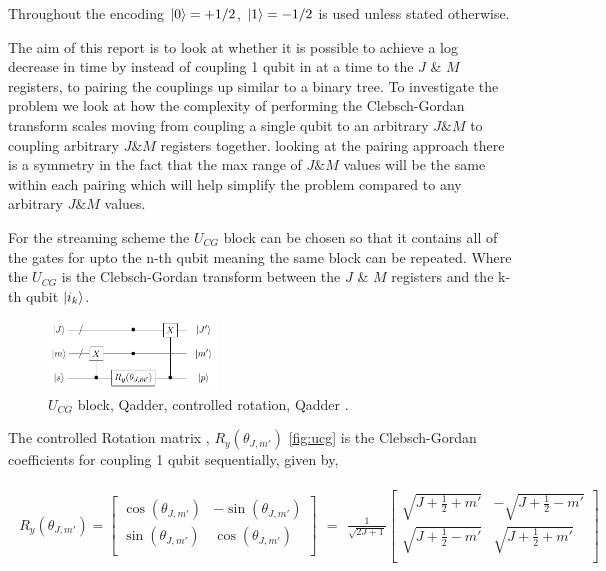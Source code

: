 \documentclass[12pt]{article}
\begin{document}
Throughout the encoding $\left\vert{0}\right\rangle=+1/2$, $\left\vert{1}\right\rangle=-1/2$ is used unless stated otherwise.

The aim of this report is to look at whether it is possible to achieve a log decrease in time by instead of coupling 1 qubit in at a time to the $J$ \& $M$ registers, to pairing the couplings up similar to a binary tree. To investigate the problem we look at how the complexity of performing the Clebsch-Gordan transform scales moving from coupling a single qubit to an arbitrary $J \& M$ to coupling arbitrary $J \& M$ registers together. looking at the pairing approach there is a symmetry in the fact that the max range of $J \& M$ values will be the same within each pairing which will help simplify the problem compared to any arbitrary $J \& M$ values.

For the streaming scheme the $U_{CG}$ block can be chosen so that it contains all of the gates for upto the n-th qubit meaning the same block can be repeated. Where the $U_{CG}$ is the Clebsch-Gordan transform between the $J$ \& $M$ registers and the k-th qubit $\left\vert{i_k}\right\rangle$.

\begin{figure}[h!]
\centering
\includegraphics[width=0.4\textwidth]{genaddercirc.png}
\caption{$U_{CG}$ block, Qadder, controlled rotation, Qadder \cite{bacon2006efficient}.}
\label{fig:ucg}
\end{figure}

The controlled Rotation matrix \cite{bacon2006efficient}, $R_y(\theta_{J,m'})$ \autoref{fig:ucg} is the Clebsch-Gordan coefficients for coupling 1 qubit sequentially, given by,

\begin{align}
\begin{split}
R_y(\theta_{J,m'})=
\begin{bmatrix}
\cos(\theta_{J,m'}) &-\sin(\theta_{J,m'}) \\
\sin(\theta_{J,m'}) & \cos(\theta_{J,m'}) \\
\end{bmatrix}
\end{split}
=
\begin{split}
\frac{1}{\sqrt{2J+1}}
\begin{bmatrix}
\sqrt{J+\frac{1}{2}+m'} &-\sqrt{J+\frac{1}{2}-m'} \\
\sqrt{J+\frac{1}{2}-m'} & \sqrt{J+\frac{1}{2}+m'} \\
\end{bmatrix}
\end{split}
\label{eq:rotmatrix}
\end{align}
\end{document}
